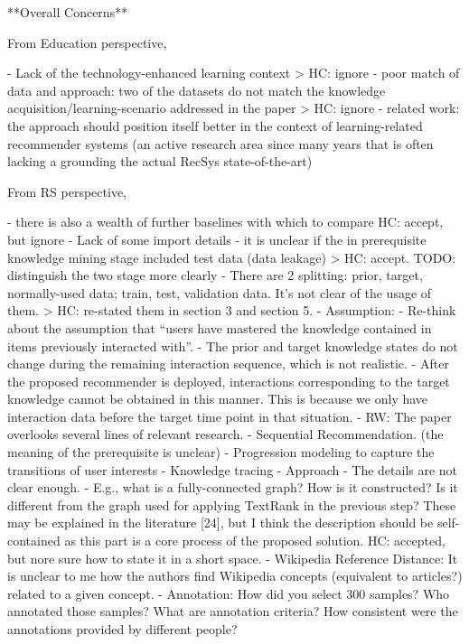 **Overall Concerns**

From Education perspective,

- Lack of the technology-enhanced learning context
> HC: ignore
- poor match of data and approach: two of the datasets do not match the knowledge acquisition/learning-scenario addressed in the paper
> HC: ignore
- related work: the approach should position itself better in the context of learning-related recommender systems (an active research area since many years that is often lacking a grounding the actual RecSys state-of-the-art)

From RS perspective,

- there is also a wealth of further baselines with which to compare
HC: accept, but ignore
- Lack of some import details
    - it is unclear if the in prerequisite knowledge mining stage included test data (data leakage)
    > HC: accept. TODO: distinguish the two stage more clearly
    - There are 2 splitting: prior, target, normally-used data; train, test, validation data. It’s not clear of the usage of them.
    > HC: re-stated them in section 3 and section 5.
- Assumption:
    - Re-think about the assumption that “users have mastered the knowledge contained in items previously interacted with”.
    - The prior and target knowledge states do not change during the remaining interaction sequence, which is not realistic.
    - After the proposed recommender is deployed, interactions corresponding to the target knowledge cannot be obtained in this manner. This is because we only have interaction data before the target time point in that situation.
- RW: The paper overlooks several lines of relevant research.
    - Sequential Recommendation. (the meaning of the prerequisite is unclear)
    - Progression modeling to capture the transitions of user interests
    - Knowledge tracing
- Approach
    - The details are not clear enough.
        - E.g., what is a fully-connected graph? How is it constructed? Is it different from the graph used for applying TextRank in the previous step? These may be explained in the literature [24], but I think the description should be self-contained as this part is a core process of the proposed solution.
        HC: accepted, but nore sure how to state it in a short space.
        - Wikipedia Reference Distance: It is unclear to me how the authors find Wikipedia concepts (equivalent to articles?) related to a given concept.
    - Annotation: How did you select 300 samples? Who annotated those samples? What are annotation criteria? How consistent were the annotations provided by different people?
